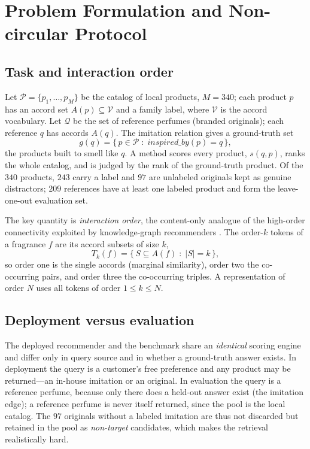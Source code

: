 \documentclass[conference]{IEEEtran}
\begin{document}
\section{Problem Formulation and Non-circular Protocol}\label{sec:problem}

\subsection{Task and interaction order}
Let $\mathcal{P}=\{p_1,\dots,p_M\}$ be the catalog of local products, $M=340$; each product
$p$ has an accord set $A(p)\subseteq\mathcal{V}$ and a family label, where $\mathcal{V}$ is
the accord vocabulary. Let $\mathcal{Q}$ be the set of reference perfumes (branded
originals); each reference $q$ has accords $A(q)$. The imitation relation gives a
ground-truth set
\begin{equation}
g(q)=\{\,p\in\mathcal{P}\;:\;\textit{inspired\_by}(p)=q\,\}, \label{eq:gold}
\end{equation}
the products built to smell like $q$. A method scores every product, $s(q,p)$, ranks the
whole catalog, and is judged by the rank of the ground-truth product. Of the $340$ products,
$243$ carry a label and $97$ are unlabeled originals kept as genuine distractors; $209$
references have at least one labeled product and form the leave-one-out evaluation set.

The key quantity is \emph{interaction order}, the content-only analogue of the high-order
connectivity exploited by knowledge-graph recommenders \cite{r20}. The order-$k$ tokens of a
fragrance $f$ are its accord subsets of size $k$,
\begin{equation}
T_k(f)=\{\,S\subseteq A(f)\;:\;|S|=k\,\}, \label{eq:order}
\end{equation}
so order one is the single accords (marginal similarity), order two the co-occurring pairs,
and order three the co-occurring triples. A representation of order $N$ uses all tokens of
order $1\le k\le N$.

\subsection{Deployment versus evaluation}
The deployed recommender and the benchmark share an \emph{identical} scoring engine and
differ only in query source and in whether a ground-truth answer exists. In deployment the
query is a customer's free preference and any product may be returned---an in-house imitation
or an original. In evaluation the query is a reference perfume, because only there does a
held-out answer exist (the imitation edge); a reference perfume is never itself returned,
since the pool is the local catalog. The $97$ originals without a labeled imitation are thus
not discarded but retained in the pool as \emph{non-target} candidates, which makes the
retrieval realistically hard.
\end{document}
